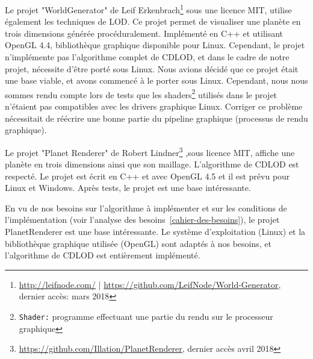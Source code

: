 Le projet "WorldGenerator" de Leif
Erkenbrach\footnote{\url{http://leifnode.com/} |
\url{https://github.com/LeifNode/World-Generator}, dernier accès: mars
2018} sous une licence MIT, utilise également les techniques de LOD. Ce projet permet de visualiser une planète en
trois dimensions générée procéduralement. Implémenté en C++ et utilisant
OpenGL 4.4, bibliothèque graphique disponible pour Linux. Cependant, le
projet n'implémente pas l'algorithme complet de CDLOD, et dans le cadre de notre projet, nécessite
d'être porté sous Linux. Nous avions décidé que ce projet était une base
viable, et avons commencé à le porter sous Linux. Cependant, nous nous
sommes rendu compte lors de tests que les
shaders\footnote{\texttt{Shader:} programme effectuant une partie du
rendu sur le processeur graphique} utilisés dans le projet
n'étaient pas compatibles avec les drivers graphique Linux.  Corriger ce
problème nécessitait de réécrire une bonne partie du pipeline graphique
(processus de rendu graphique). 

Le projet "Planet Renderer" de Robert
Lindner\footnote{\url{https://github.com/Illation/PlanetRenderer},
dernier accès avril 2018} ,sous licence MIT, affiche une
planète en trois dimensions ainsi que son maillage. L'algorithme de
CDLOD est respecté. Le projet est écrit en C++ et avec OpenGL 4.5 et il
est prévu pour Linux et Windows. Après tests, le projet est une base
intéressante.

En vu de nos besoins sur l'algorithme à implémenter et sur les
conditions de l'implémentation (voir l'analyse des
besoins~\ref{cahier-des-besoins}), le projet PlanetRenderer est une base
intéressante. Le système d'exploitation (Linux) et la bibliothèque
graphique utilisée (OpenGL) sont adaptés à nos besoins, et l'algorithme
de CDLOD est entièrement implémenté.
